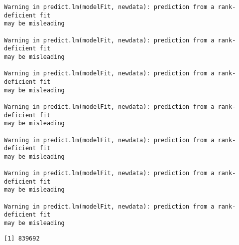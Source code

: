\documentclass[
  letterpaper,
  DIV=11,
  numbers=noendperiod]{scrartcl}
\begin{document}
\begin{verbatim}
Warning in predict.lm(modelFit, newdata): prediction from a rank-deficient fit
may be misleading

Warning in predict.lm(modelFit, newdata): prediction from a rank-deficient fit
may be misleading

Warning in predict.lm(modelFit, newdata): prediction from a rank-deficient fit
may be misleading

Warning in predict.lm(modelFit, newdata): prediction from a rank-deficient fit
may be misleading

Warning in predict.lm(modelFit, newdata): prediction from a rank-deficient fit
may be misleading

Warning in predict.lm(modelFit, newdata): prediction from a rank-deficient fit
may be misleading

Warning in predict.lm(modelFit, newdata): prediction from a rank-deficient fit
may be misleading
\end{verbatim}

\begin{verbatim}
[1] 839692
\end{verbatim}
\end{document}
